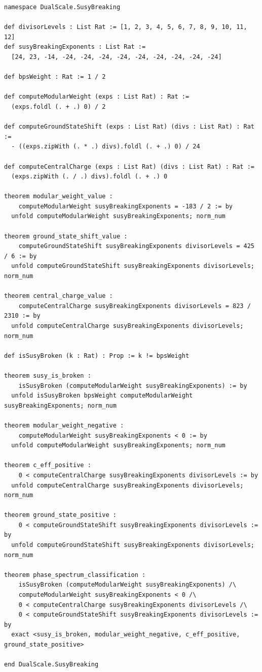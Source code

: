 \documentclass[11pt,a4paper]{article}
\theoremstyle{plain}
\theoremstyle{definition}
\theoremstyle{remark}
\begin{document}
\begin{lstlisting}[caption={SUSY Breaking phase spectrum (VERIFIED, 0 sorry).}]
namespace DualScale.SusyBreaking

def divisorLevels : List Rat := [1, 2, 3, 4, 5, 6, 7, 8, 9, 10, 11, 12]
def susyBreakingExponents : List Rat :=
  [24, 23, -14, -24, -24, -24, -24, -24, -24, -24, -24, -24]

def bpsWeight : Rat := 1 / 2

def computeModularWeight (exps : List Rat) : Rat :=
  (exps.foldl (. + .) 0) / 2

def computeGroundStateShift (exps : List Rat) (divs : List Rat) : Rat :=
  - ((exps.zipWith (. * .) divs).foldl (. + .) 0) / 24

def computeCentralCharge (exps : List Rat) (divs : List Rat) : Rat :=
  (exps.zipWith (. / .) divs).foldl (. + .) 0

theorem modular_weight_value :
    computeModularWeight susyBreakingExponents = -183 / 2 := by
  unfold computeModularWeight susyBreakingExponents; norm_num

theorem ground_state_shift_value :
    computeGroundStateShift susyBreakingExponents divisorLevels = 425 / 6 := by
  unfold computeGroundStateShift susyBreakingExponents divisorLevels; norm_num

theorem central_charge_value :
    computeCentralCharge susyBreakingExponents divisorLevels = 823 / 2310 := by
  unfold computeCentralCharge susyBreakingExponents divisorLevels; norm_num

def isSusyBroken (k : Rat) : Prop := k != bpsWeight

theorem susy_is_broken :
    isSusyBroken (computeModularWeight susyBreakingExponents) := by
  unfold isSusyBroken bpsWeight computeModularWeight susyBreakingExponents; norm_num

theorem modular_weight_negative :
    computeModularWeight susyBreakingExponents < 0 := by
  unfold computeModularWeight susyBreakingExponents; norm_num

theorem c_eff_positive :
    0 < computeCentralCharge susyBreakingExponents divisorLevels := by
  unfold computeCentralCharge susyBreakingExponents divisorLevels; norm_num

theorem ground_state_positive :
    0 < computeGroundStateShift susyBreakingExponents divisorLevels := by
  unfold computeGroundStateShift susyBreakingExponents divisorLevels; norm_num

theorem phase_spectrum_classification :
    isSusyBroken (computeModularWeight susyBreakingExponents) /\
    computeModularWeight susyBreakingExponents < 0 /\
    0 < computeCentralCharge susyBreakingExponents divisorLevels /\
    0 < computeGroundStateShift susyBreakingExponents divisorLevels := by
  exact <susy_is_broken, modular_weight_negative, c_eff_positive, ground_state_positive>

end DualScale.SusyBreaking
\end{lstlisting}
\end{document}
